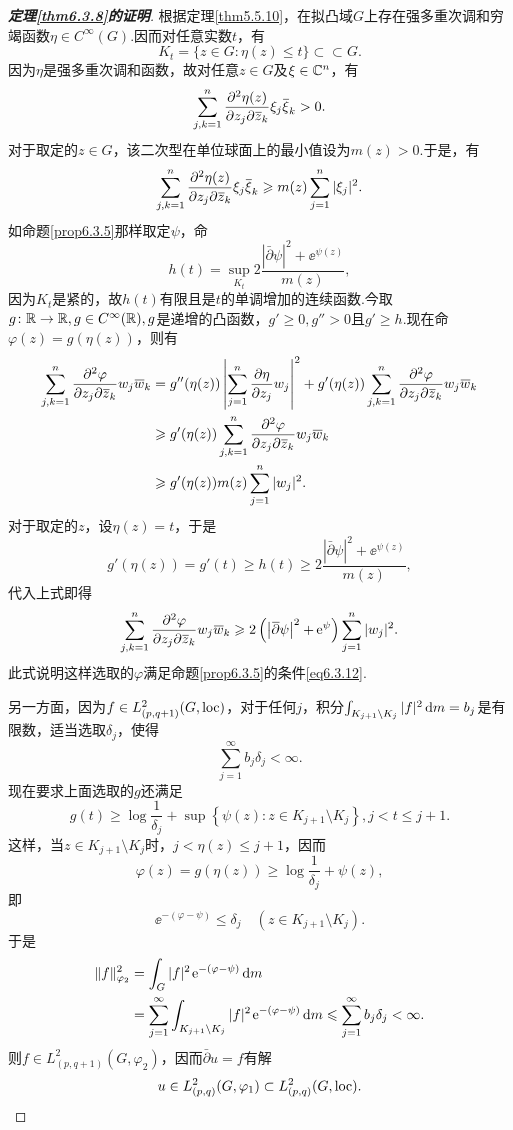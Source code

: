 	\begin{proof}[\textbf{定理\ref{thm6.3.8}的证明}]
		根据定理\ref{thm5.5.10}，在拟凸域$G$上存在强多重次调和穷竭函数$\eta\in C^\infty(G)$.因而对任意实数$t$，有
		\[K_t=\{z\in G\colon \eta(z)\le t\}\subset\subset G.\]
		因为$\eta$是强多重次调和函数，故对任意$z\in G$及$\xi\in\mathbb C^n$，有
		\[\sum_{j,k=1}^{n}\frac{\partial^2 \eta(z)}{\partial z_j\partial {}\mkern1mu\overline{\mkern-1muz}_k}\xi_j{}\mkern1mu\overline{\mkern-1mu\xi}_k>0.\]
		对于取定的$z\in G$，该二次型在单位球面上的最小值设为$m(z)>0$.于是，有
		\[\sum_{j,k=1}^{n}\frac{\partial^2 \eta(z)}{\partial z_j\partial {}\mkern1mu\overline{\mkern-1muz}_k}\xi_j{}\mkern1mu\overline{\mkern-1mu\xi}_k\geqslant m(z)\sum_{j=1}^{n}|\xi_j|^2.\]
		如命题\ref{prop6.3.5}那样取定$\psi$，命
		\[h(t)=\sup_{K_t}2\frac{\left|\bar{\partial}\psi\right|^2+\ee^{\psi(z)}}{m(z)},\]
		因为$K_t$是紧的，故$h(t)$有限且是$t$的单调增加的连续函数.今取$g\colon \mathbb R\to\mathbb R,g\in C^\infty(\mathbb R),g$是递增的凸函数，$g'\ge0,g''>0$且$g'\ge h$.现在命$\varphi(z)=g(\eta(z))$，则有
		\begin{align*}
			\sum_{j,k=1}^{n}\frac{\partial^2 \varphi}{\partial z_j\partial {}\mkern1mu\overline{\mkern-1muz}_k}w_j{}\mkern1mu\overline{\mkern-1muw}_k
			&=g''(\eta(z))\left|\sum_{j=1}^{n}\frac{\partial \eta}{\partial z_j}w_j\right|^2+g'(\eta(z))\sum_{j,k=1}^{n}\frac{\partial^2 \varphi}{\partial z_j\partial {}\mkern1mu\overline{\mkern-1muz}_k}w_j{}\mkern1mu\overline{\mkern-1muw}_k\\
			&\geqslant g'(\eta(z))\sum_{j,k=1}^{n}\frac{\partial^2 \varphi}{\partial z_j\partial {}\mkern1mu\overline{\mkern-1muz}_k}w_j{}\mkern1mu\overline{\mkern-1muw}_k\\
			&\geqslant g'(\eta(z))m(z)\sum_{j=1}^{n}|w_j|^2.
		\end{align*}
		对于取定的$z$，设$\eta(z)=t$，于是
		\[g'(\eta(z))=g'(t)\ge h(t)\ge2\frac{\left|\bar{\partial}\psi\right|^2+\ee^{\psi(z)}}{m(z)},\]
		代入上式即得
		\[\sum_{j,k=1}^{n}\frac{\partial^2 \varphi}{\partial z_j\partial {}\mkern1mu\overline{\mkern-1muz}_k}w_j{}\mkern1mu\overline{\mkern-1muw}_k\geqslant2\left(\left|{}\mkern1mu\overline{\mkern-1mu\partial}\psi\right|^2+\operatorname{\!\!\;\mathrm e}^\psi\right)\sum_{j=1}^{n}|w_j|^2.\]
		此式说明这样选取的$\varphi$满足命题\ref{prop6.3.5}的条件\eqref{eq6.3.12}.
		
		另一方面，因为$f\in L_{(p,q+1)}^2(G,\operatorname{loc})$，对于任何$j$，积分$\int_{K_{j+1}\setminus K_j}|f|^2\mathop{}\!\mathrm{d} m=b_j$是有限数，适当选取$\delta_j$，使得
		\[\sum_{j=1}^{\infty}b_j\delta_j<\infty.\]
		现在要求上面选取的$g$还满足
		\[g(t)\ge\log\frac1{\delta_j}+\sup\left\{\psi(z)\colon z\in K_{j+1}\setminus K_j\right\},j<t\le j+1.\]
		这样，当$z\in K_{j+1}\setminus K_j$时，$j<\eta(z)\le j+1$，因而
		\[\varphi(z)=g(\eta(z))\ge\log\frac1{\delta_j}+\psi(z),\]
		即
		\[\ee^{-(\varphi-\psi)}\le\delta_j\quad(z\in K_{j+1}\setminus K_j).\]
		于是
		\begin{align*}
			\Vert f\Vert_{\varphi_2}^2
			&=\int_G |f|^2\operatorname{\!\!\;\mathrm e}^{-(\varphi-\psi)}\mathop{}\!\mathrm{d} m\\
			&=\sum_{j=1}^{\infty}\int_{K_{j+1}\setminus K_j}|f|^2\operatorname{\!\!\;\mathrm e}^{-(\varphi-\psi)}\mathop{}\!\mathrm{d} m\leqslant\sum_{j=1}^{\infty} b_j\delta_j<\infty.
		\end{align*}
		则$f\in L_{(p,q+1)}^2(G,\varphi_2)$，因而$\bar{\partial}u=f$有解
		\[u\in L_{(p,q)}^2(G,\varphi_1)\subset L_{(p,q)}^2(G,\operatorname{loc}).\qedhere\]
	\end{proof}
